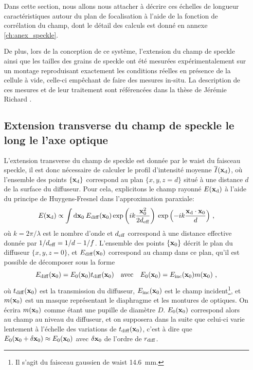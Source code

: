 Dans cette section, nous allons nous attacher à décrire ces échelles de longueur caractéristiques autour du plan de focalisation à l'aide de la fonction de corrélation du champ, dont le détail des calculs est donné en annexe \ref{ch:anex_speckle}. 

De plus, lors de la conception de ce système, l'extension du champ de speckle ainsi que les tailles des grains de speckle ont été mesurées expérimentalement sur un montage reproduisant exactement les conditions réelles en présence de la cellule à vide, celle-ci empêchant de faire des mesures in-situ. La description de ces mesures et de leur traitement sont référencées dans la thèse de Jérémie Richard \citep{richard2015propagation}.




\subsection{Extension transverse du champ de speckle le long le l'axe optique}
L'extension transverse du champ de speckle est donnée par le waist du faisceau speckle, il est donc nécessaire de calculer le profil d'intensité moyenne $\overline{I}(\mathbf{x}_{\mathrm{d}})$, où l'ensemble des points $\lbrace\mathbf{x}_{\mathrm{d}}\rbrace$ correspond au plan $\lbrace x,y,z=d \rbrace$ situé à une distance $d$ de la surface du diffuseur. Pour cela, explicitons le champ rayonné $E(\mathbf{x}_{\mathrm{d}})$ à l'aide du principe de Huygens-Fresnel dans l'approximation paraxiale:
\begin{equation}
E(\mathbf{x}_{\mathrm{d}}) \propto \int{\mathrm{d}\mathbf{x}_0\: E_{\mathrm{diff}}(\mathbf{x}_0) \exp{\left( ik\frac{\mathbf{x}_0^2}{2d_{\mathrm{eff}}} \right) } \: \exp{\left( -ik \frac{\mathbf{x}_{\mathrm{d}}\cdot \mathbf{x}_0}{d} \right) } } \text{ ,}
\label{eq:amplitude_rayonnee}
\end{equation}
où $k=2\pi/\lambda$ est le nombre d'onde et $d_{\mathrm{eff}}$ correspond à une distance effective donnée par $1/d_{\mathrm{eff}}=1/d-1/f$. L'ensemble des points $\lbrace\mathbf{x}_0\rbrace$ décrit le plan du diffuseur $\lbrace x,y,z=0 \rbrace$, et $E_{\mathrm{diff}} (\mathbf{x}_0)$ correspond au champ dans ce plan, qu'il est possible de décomposer sous la forme 
\begin{equation}
E_{\mathrm{diff}}(\mathbf{x}_0)=E_0(\mathbf{x}_0) t_{\mathrm{diff}}(\mathbf{x}_0) \quad \text{avec} \quad E_0(\mathbf{x}_0) = E_\mathrm{inc} (\mathbf{x}_0) m(\mathbf{x}_0) \text{ ,}
\end{equation}
où $t_{\mathrm{diff}}(\mathbf{x}_0)$ est la transmission du diffuseur, $E_{\mathrm{inc}}(\mathbf{x}_0)$ est le champ incident\footnote{Il s'agit du faisceau gaussien de waist \SI{14.6}{\milli\metre}.}, et $m(\mathbf{x}_0)$ est un masque représentant le diaphragme et les montures de optiques. On écrira $m(\mathbf{x}_0)$ comme étant une pupille de diamètre $D$. $E_0(\mathbf{x}_0)$ correspond alors au champ au niveau du diffuseur, et on supposera dans la suite que celui-ci varie lentement à l'échelle des variations de $t_{\mathrm{diff}}(\mathbf{x}_0)$, c'est à dire que $E_0(\mathbf{x}_0+\delta\mathbf{x}_0)\approx E_0(\mathbf{x}_0)$ avec $\delta\mathbf{x}_0$ de l'ordre de $r_{\mathrm{diff}}$.

